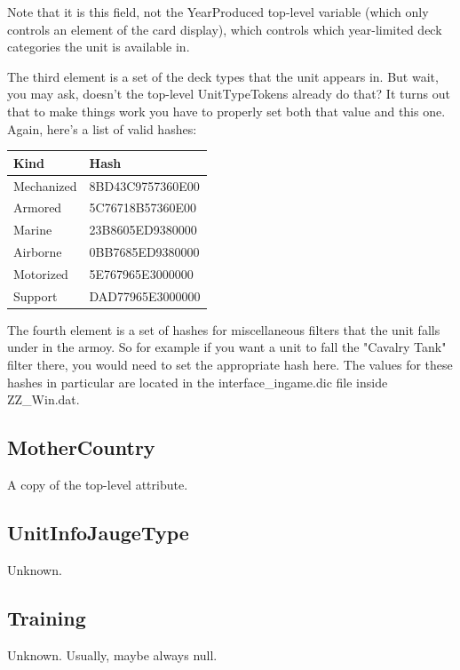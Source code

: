 \documentclass{article}
\begin{document}
Note that it is this field, not the YearProduced top-level variable (which only controls an element of the card display), which controls which year-limited deck categories the unit is available in.

The third element is a set of the deck types that the unit appears in. But wait, you may ask, doesn't the top-level UnitTypeTokens already do that? It turns out that to make things work you have to properly set both that value and this one. Again, here's a list of valid hashes:

\begin{center}
    \begin{tabular}{ | l | l |}
    \hline
	Kind & Hash\\ \hline
	Mechanized & 8BD43C9757360E00\\
	Armored & 5C76718B57360E00\\
	Marine & 23B8605ED9380000\\
	Airborne & 0BB7685ED9380000\\
	Motorized & 5E767965E3000000\\
	Support & DAD77965E3000000\\
    \hline
    \end{tabular}
\end{center}

The fourth element is a set of hashes for miscellaneous filters that the unit falls under in the armoy. So for example if you want a unit to fall the "Cavalry Tank" filter there, you would need to set the appropriate hash here. The values for these hashes in particular are located in the interface\_ingame.dic file inside ZZ\_Win.dat.

\subsection{MotherCountry}

A copy of the top-level attribute.

\subsection{UnitInfoJaugeType}

Unknown.

\subsection{Training}

Unknown. Usually, maybe always null.
\end{document}
